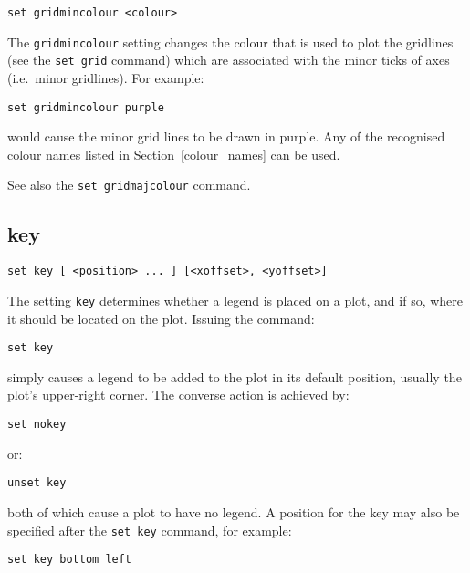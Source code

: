 \begin{verbatim}
set gridmincolour <colour>
\end{verbatim}

The {\tt gridmincolour} setting changes the colour that is used to plot the
gridlines (see the {\tt set grid} command) which are associated with the minor
ticks of axes (i.e.\ minor gridlines). For example:

\begin{verbatim}
set gridmincolour purple
\end{verbatim}

\noindent would cause the minor grid lines to be drawn in purple. Any of the recognised
colour names listed in Section~\ref{colour_names} can be used.

See also the {\tt set gridmajcolour} command.

\subsection{key}

\begin{verbatim}
set key [ <position> ... ] [<xoffset>, <yoffset>]
\end{verbatim}

The setting {\tt key} determines whether a legend is placed on a plot, and if
so, where it should be located on the plot. Issuing the command:

\begin{verbatim}
set key
\end{verbatim}

\noindent simply causes a legend to be added to the plot in its default position, usually
the plot's upper-right corner. The converse action is achieved by:

\begin{verbatim}
set nokey
\end{verbatim}

\noindent or:

\begin{verbatim}
unset key
\end{verbatim}

\noindent both of which cause a plot to have no legend. A position for the key may also
be specified after the {\tt set key} command, for example:

\begin{verbatim}
set key bottom left
\end{verbatim}

